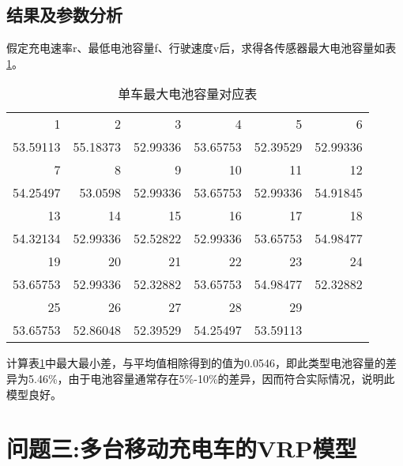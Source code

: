 \documentclass[withoutpreface,bwprint]{cumcmthesis} %
\begin{document}
\subsection{结果及参数分析}
假定充电速率r、最低电池容量f、行驶速度v后，求得各传感器最大电池容量如表\ref{tab:b1}。
\begin{table}[!h]
  \centering
  \caption{单车最大电池容量对应表}
    \begin{tabular}{rrrrrr}
	\toprule[1.5pt]
    1     & 2     & 3     & 4     & 5     & 6 \\
    53.59113 & 55.18373 & 52.99336 & 53.65753 & 52.39529 & 52.99336 \\
    7     & 8     & 9     & 10    & 11    & 12 \\
    54.25497 & 53.0598 & 52.99336 & 53.65753 & 52.99336 & 54.91845 \\
    13    & 14    & 15    & 16    & 17    & 18 \\
    54.32134 & 52.99336 & 52.52822 & 52.99336 & 53.65753 & 54.98477 \\
    19    & 20    & 21    & 22    & 23    & 24 \\
    53.65753 & 52.99336 & 52.32882 & 53.65753 & 54.98477 & 52.32882 \\
    25    & 26    & 27    & 28    & 29    &  \\
    53.65753 & 52.86048 & 52.39529 & 54.25497 & 53.59113 &  \\
    \bottomrule[1.5pt]
    \end{tabular}%
  \label{tab:b1}%
\end{table}%
计算表\ref{tab:b1}中最大最小差，与平均值相除得到的值为0.0546，即此类型电池容量的差异为5.46\%，由于电池容量通常存在5\%-10\%的差异，因而符合实际情况，说明此模型良好。




\section{问题三:多台移动充电车的VRP模型}
\end{document}

